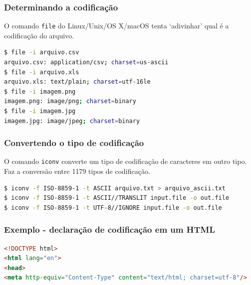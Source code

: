 
\begin{frame}[fragile]
\frametitle{Determinando a codificação}

O comando \texttt{file} do Linux/Unix/OS X/macOS tenta `adivinhar' qual é a codificação do arquivo.

\begin{lstlisting}[language=bash, label=lst-filecod, caption={Determinando o tipo de codificação de um arquivo.}, postbreak=\mbox{$\hookrightarrow$\space}, basicstyle=\fontsize{8}{10}\selectfont\ttfamily]
$ file -i arquivo.csv
arquivo.csv: application/csv; charset=us-ascii
$ file -i arquivo.xls 
arquivo.xls: text/plain; charset=utf-16le
$ file -i imagem.png 
imagem.png: image/png; charset=binary
$ file -i imagem.jpg 
imagem.jpg: image/jpeg; charset=binary
\end{lstlisting}
\end{frame}

\begin{frame}[fragile]
\frametitle{Convertendo o tipo de codificação}
O comando \texttt{iconv} converte um tipo de codificação de caracteres em outro tipo. Faz a conversão entre 1179 tipos de codificação.
\begin{lstlisting}[language=bash, label=lst-iconv, caption={Convertendo o tipo de codificação de um arquivo.}, postbreak=\mbox{$\hookrightarrow$\space}, basicstyle=\fontsize{8}{10}\selectfont\ttfamily]
$ iconv -f ISO-8859-1 -t ASCII arquivo.txt > arquivo_ascii.txt
$ iconv -f ISO-8859-1 -t ASCII//TRANSLIT input.file -o out.file
$ iconv -f ISO-8859-1 -t UTF-8//IGNORE input.file -o out.file
\end{lstlisting}
\end{frame}

\begin{frame}[fragile]
\frametitle{Exemplo - declaração de codificação em um HTML}
\begin{lstlisting}[language=html, label=lst-htmlenc, caption={Documento HTML.}, postbreak=\mbox{$\hookrightarrow$\space}, basicstyle=\fontsize{8}{10}\selectfont\ttfamily]
<!DOCTYPE html>
<html lang="en">
<head>
<meta http-equiv="Content-Type" content="text/html; charset=utf-8"/>
\end{lstlisting}
\end{frame}


